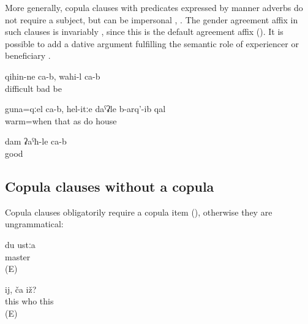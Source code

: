 More generally, copula clauses with predicates expressed by manner adverbs do not require a subject, but can be impersonal , . The gender agreement affix in such clauses is invariably , since this is the default agreement affix (). It is possible to add a dative argument fulfilling the semantic role of experiencer or beneficiary .
%
\begin{exe}
	\ex	\label{ex:‎It is difficult, it is bad}
	\gll	qihin-ne	ca-b,	wahi-l	ca-b	\\
		difficult		bad	be	\\
	\glt	{}

	\ex	\label{ex:‎When it is warm (i.e. in warm places) the houses are built like this}
	\gll	guna=qːel	ca-b,	hel-itːe	daˁʡle	b-arq'-ib	qal\\
		warm=when		that	as	do	house	\\
	\glt	{}

	\ex	\label{ex:I am well}
	\gll	dam ʡaˁħ-le ca-b\\
			good	\\
	\glt	{}
\end{exe}



\subsection{Copula clauses without a copula}
\label{ssec:Copula clauses without a copula}

Copula clauses obligatorily require a copula item (), otherwise they are ungrammatical: 
%
\begin{exe}
	\ex	\label{ex:I am a master}
	\gll	{*} du	ustːa\\
		{}		master\\
	\glt	{} (E)

	\ex	\label{ex:This, who is it}
	\gll	{*}	ij,	ča	iž?\\
		{}	this	who	this \\
	\glt	{} (E)
\end{exe}

